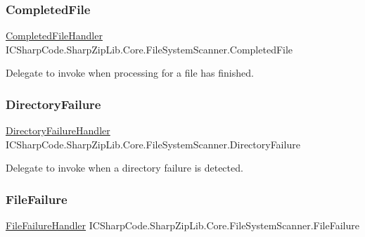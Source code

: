 \subsubsection{\texorpdfstring{Completed\+File}{CompletedFile}}
{\footnotesize\ttfamily \hyperlink{namespace_i_c_sharp_code_1_1_sharp_zip_lib_1_1_core_aecab27a02c97037c68a78142fbbdc069}{Completed\+File\+Handler} I\+C\+Sharp\+Code.\+Sharp\+Zip\+Lib.\+Core.\+File\+System\+Scanner.\+Completed\+File}



Delegate to invoke when processing for a file has finished. 

\mbox{\label{class_i_c_sharp_code_1_1_sharp_zip_lib_1_1_core_1_1_file_system_scanner_a25a0c2b16ec9583b9bb4bd2e6bbb4f02}} 
\subsubsection{\texorpdfstring{Directory\+Failure}{DirectoryFailure}}
{\footnotesize\ttfamily \hyperlink{namespace_i_c_sharp_code_1_1_sharp_zip_lib_1_1_core_a59ce8afe31b0ed5684e54008b1c8dd33}{Directory\+Failure\+Handler} I\+C\+Sharp\+Code.\+Sharp\+Zip\+Lib.\+Core.\+File\+System\+Scanner.\+Directory\+Failure}



Delegate to invoke when a directory failure is detected. 

\mbox{\label{class_i_c_sharp_code_1_1_sharp_zip_lib_1_1_core_1_1_file_system_scanner_a4a2920d13e51dc762aff6e461dc8812f}} 
\subsubsection{\texorpdfstring{File\+Failure}{FileFailure}}
{\footnotesize\ttfamily \hyperlink{namespace_i_c_sharp_code_1_1_sharp_zip_lib_1_1_core_a956b875da234d5808c4151b3ac822f80}{File\+Failure\+Handler} I\+C\+Sharp\+Code.\+Sharp\+Zip\+Lib.\+Core.\+File\+System\+Scanner.\+File\+Failure}



